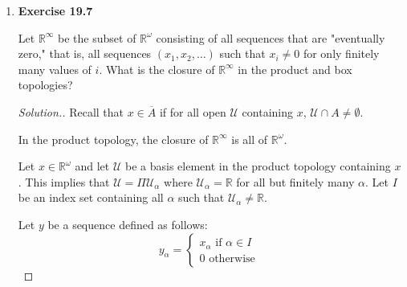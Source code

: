 \documentclass{article}
\newcommand{\U}{\mathcal{U}}
\newcommand{\R}{\mathbb{R}}
\newcommand{\N}{\mathbb{N}}
\newcommand{\sk}{\smallskip}
\begin{document}
\begin{enumerate}
\begin{proof}[Solution.]
    \sk

    This is not true for the box topology, since this relied upon us being able to choose $N = \max(N_\alpha)$. We will prove that this statement is not true in the box topology. 

    \sk
    
    Consider the box topology on $\R^\N$. Define $x_n$ to be $\left(\frac{1}{n}, \frac{1}{n}, \dots \right)$. Then for each $\alpha$, $(\pi_\alpha(x_n)) \longrightarrow 0$, since the sequence $\left(\frac{1}{n}\right) \longrightarrow 0$. Consider the open set $\U = \Pi \left(-\frac{1}{n}, \frac{1}{n}\right)$. Clearly $(0, 0, \dots) \in \U$, since $-\frac{1}{n} < 0 < \frac{1}{n}$. However, no $x_n \in \U$, since the $n+1^\text{st}$ term in $x_n$ is not an element of $\left(-\frac{1}{n+1}, \frac{1}{n+1}\right)$. Thus, for every $N$, there exists an $n \geq N$ such that $x_n \notin \U$, and so $(x_n) \not\longrightarrow x$ in the box topology.
        
    \end{proof}

    \item \textbf{Exercise 19.7}

    Let $\R^\infty$ be the subset of $\R^\omega$ consisting of all sequences that are "eventually zero," that is, all sequences $(x_1, x_2, \dots )$ such that $x_i \neq 0$ for only finitely many values of $i$. What is the closure of $\R^\infty$ in the product and box topologies? 

    \begin{proof}[Solution.]
        Recall that $x \in \overline{A}$ if for all open $\U$ containing $x$, $\U \cap A \neq \emptyset$. 

        \sk
        
        In the product topology, the closure of $\R^\infty$ is all of $\R^\omega$. 

        \sk

        Let $x \in \R^\omega$ and let $\U$ be a basis element in the product topology containing $x$. This implies that $\U = \Pi \U_\alpha$ where $\U_\alpha = \R$ for all but finitely many $\alpha$. Let $I$ be an index set containing all $\alpha$ such that $\U_\alpha \neq \R$. 

        \sk

        Let $y$ be a sequence defined as follows: 
        $$y_\alpha = \begin{cases}
            x_\alpha \text{ if } \alpha \in I \\
            0 \text{ otherwise }
        \end{cases}$$ 


\end{proof}
\end{enumerate}
\end{document}
